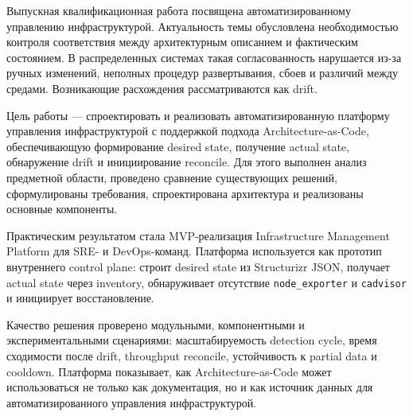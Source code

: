 \abstract %


Выпускная квалификационная работа посвящена автоматизированному управлению инфраструктурой. Актуальность темы обусловлена необходимостью контроля соответствия между архитектурным описанием и фактическим состоянием. В распределенных системах такая согласованность нарушается из-за ручных изменений, неполных процедур развертывания, сбоев и различий между средами. Возникающие расхождения рассматриваются как drift.

Цель работы --- спроектировать и реализовать автоматизированную платформу управления инфраструктурой с поддержкой подхода Architecture-as-Code, обеспечивающую формирование desired state, получение actual state, обнаружение drift и инициирование reconcile. Для этого выполнен анализ предметной области, проведено сравнение существующих решений, сформулированы требования, спроектирована архитектура и реализованы основные компоненты.

Практическим результатом стала MVP-реализация Infrastructure Management Platform для SRE- и DevOps-команд. Платформа используется как прототип внутреннего control plane: строит desired state из Structurizr JSON, получает actual state через inventory, обнаруживает отсутствие \texttt{node\_exporter} и \texttt{cadvisor} и инициирует восстановление.

Качество решения проверено модульными, компонентными и экспериментальными сценариями: масштабируемость detection cycle, время сходимости после drift, throughput reconcile, устойчивость к partial data и cooldown. Платформа показывает, как Architecture-as-Code может использоваться не только как документация, но и как источник данных для автоматизированного управления инфраструктурой.
